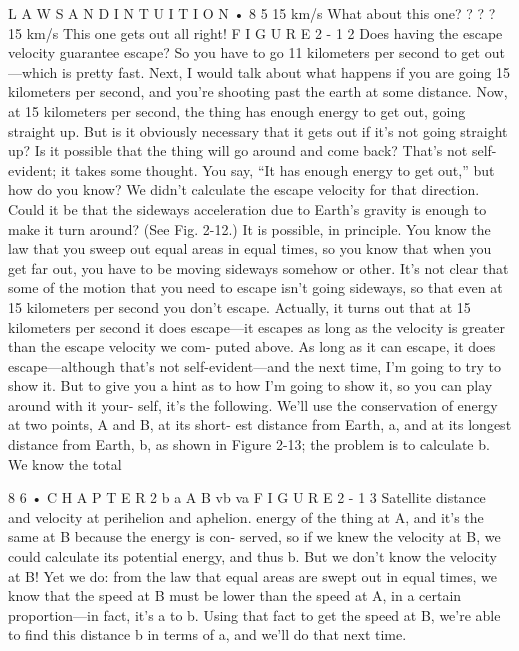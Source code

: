 \documentclass[10pt,oneside]{article}
\begin{document}
L A W S  A N D  I N T U I T I O N • 8 5 15 km/s What about this one? ? ? ? 15 km/s This one gets out all right! F I G U R E  2 - 1 2 Does having the escape velocity guarantee escape? So you have to go 11 kilometers per second to get out---which is pretty fast. Next, I would talk about what happens if you are going 15 kilometers per second, and you’re shooting past the earth at some distance. Now, at 15 kilometers per second, the thing has enough energy to get out, going straight up. But is it obviously necessary that it gets out if it’s not going straight up? Is it possible that the thing will go around and come back? That’s not self-evident; it takes some thought. You say, “It has enough energy to get out,” but how do you know? We didn’t calculate the escape velocity for that direction. Could it be that the sideways acceleration due to Earth’s gravity is enough to make it turn around? (See Fig. 2-12.) It is possible, in principle. You know the law that you sweep out equal areas in equal times, so you know that when you get far out, you have to be moving sideways somehow or other. It’s not clear that some of the motion that you need to escape isn’t going sideways, so that even at 15 kilometers per second you don’t escape. Actually, it turns out that at 15 kilometers per second it does escape---it escapes as long as the velocity is greater than the escape velocity we com- puted above. As long as it can escape, it does escape---although that’s not self-evident---and the next time, I’m going to try to show it. But to give you a hint as to how I’m going to show it, so you can play around with it your- self, it’s the following. We’ll use the conservation of energy at two points, A and B, at its short- est distance from Earth, a, and at its longest distance from Earth, b, as shown in Figure 2-13; the problem is to calculate b. We know the total\par

8 6 • C H A P T E R  2 b a A B vb va F I G U R E  2 - 1 3 Satellite distance and velocity at perihelion and aphelion. energy of the thing at A, and it’s the same at B because the energy is con- served, so if we knew the velocity at B, we could calculate its potential energy, and thus b. But we don’t know the velocity at B! Yet we do: from the law that equal areas are swept out in equal times, we know that the speed at B must be lower than the speed at A, in a certain proportion---in fact, it’s a to b. Using that fact to get the speed at B, we’re able to find this distance b in terms of a, and we’ll do that next time.\par
\end{document}

